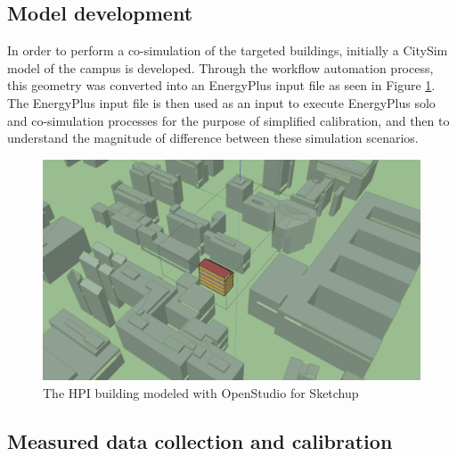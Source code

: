 \documentclass{tBPS2e}
\theoremstyle{plain}
\theoremstyle{definition}
\theoremstyle{remark}
\begin{document}
\subsection{Model development}
In order to perform a co-simulation of the targeted buildings, initially a CitySim model of the campus is developed. Through the workflow automation process, this geometry was converted into an EnergyPlus input file as seen in Figure \ref{fig:HPIcampus}. The EnergyPlus input file is then used as an input to execute EnergyPlus solo and co-simulation processes for the purpose of simplified calibration, and then to understand the magnitude of difference between these simulation scenarios.

\begin{figure}[H]
\centering
\includegraphics[scale=0.2]{figures/HPI_Campus.png}
\caption{The HPI building modeled with OpenStudio for Sketchup}
\label{fig:HPIcampus}
\end{figure}


\subsection{Measured data collection and calibration}
\end{document}
